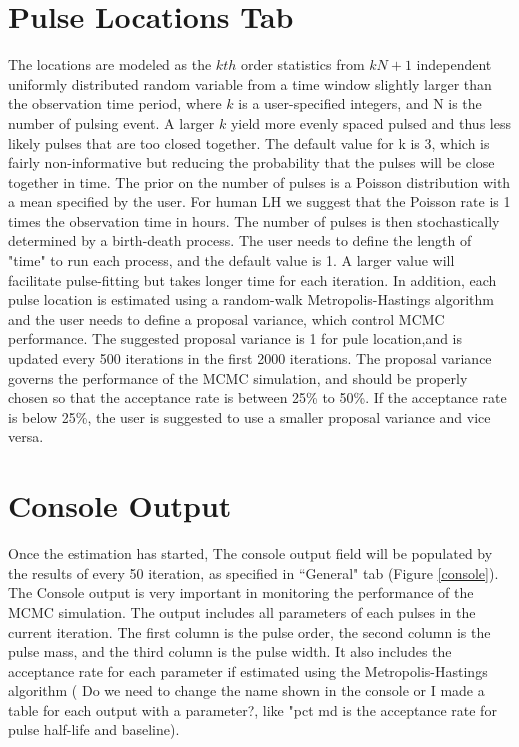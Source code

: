 \documentclass[11pt]{book}
\begin{document}
\section{Pulse Locations Tab} \label{p2}
The locations are modeled as the $kth$ order statistics from $kN+1$ independent uniformly distributed random variable from a time window slightly larger than the observation time period, where $k$ is a user-specified integers, and N is the number of pulsing event. A larger $k$ yield more evenly spaced pulsed and thus less likely pulses that are too closed together. The default value for k is 3, which is fairly non-informative but reducing the probability that the pulses will be close together in time. The prior on the number of pulses is a Poisson distribution with a mean specified by the user. For human LH we suggest that the Poisson rate is 1 times the observation time in hours. The number of pulses is then stochastically determined by a birth-death process. The user needs to define the length of "time" to run each process, and the default value is 1. A larger value will facilitate pulse-fitting but takes longer time for each iteration. In addition, each pulse location is estimated using a random-walk Metropolis-Hastings algorithm and the user needs to define a proposal variance, which control MCMC performance. The suggested proposal variance  is 1 for pule location,and is updated every 500 iterations in the first 2000 iterations. The proposal variance governs the performance of the MCMC simulation, and should be properly chosen so that the acceptance rate is between 25\% to 50\%. If the acceptance rate is below 25\%, the user is suggested to use a smaller proposal variance and vice versa.

\newpage
\section{Console Output}\label{o1}
Once the estimation has started, The console output field will be populated by the results of every 50 iteration, as specified in ``General" tab (Figure \ref{console}). The Console output is very important in monitoring the performance of the MCMC simulation. The output includes all parameters of each pulses in the current iteration. The first column is the pulse order, the second column is the pulse mass, and the third column is the pulse width. It also includes the acceptance rate for each parameter if estimated using the Metropolis-Hastings algorithm ( Do we need to change the name shown in the console or I made a table for each output with a parameter?, like "pct md is the acceptance rate for pulse half-life and baseline).
\end{document}
